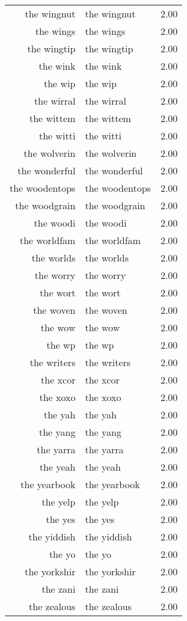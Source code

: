 \begin{table}[ht]
\begin{tabular}{rlr}
  the wingnut & the wingnut & 2.00 \\ 
  the wings & the wings & 2.00 \\ 
  the wingtip & the wingtip & 2.00 \\ 
  the wink & the wink & 2.00 \\ 
  the wip & the wip & 2.00 \\ 
  the wirral & the wirral & 2.00 \\ 
  the wittem & the wittem & 2.00 \\ 
  the witti & the witti & 2.00 \\ 
  the wolverin & the wolverin & 2.00 \\ 
  the wonderful & the wonderful & 2.00 \\ 
  the woodentops & the woodentops & 2.00 \\ 
  the woodgrain & the woodgrain & 2.00 \\ 
  the woodi & the woodi & 2.00 \\ 
  the worldfam & the worldfam & 2.00 \\ 
  the worlds & the worlds & 2.00 \\ 
  the worry & the worry & 2.00 \\ 
  the wort & the wort & 2.00 \\ 
  the woven & the woven & 2.00 \\ 
  the wow & the wow & 2.00 \\ 
  the wp & the wp & 2.00 \\ 
  the writers & the writers & 2.00 \\ 
  the xcor & the xcor & 2.00 \\ 
  the xoxo & the xoxo & 2.00 \\ 
  the yah & the yah & 2.00 \\ 
  the yang & the yang & 2.00 \\ 
  the yarra & the yarra & 2.00 \\ 
  the yeah & the yeah & 2.00 \\ 
  the yearbook & the yearbook & 2.00 \\ 
  the yelp & the yelp & 2.00 \\ 
  the yes & the yes & 2.00 \\ 
  the yiddish & the yiddish & 2.00 \\ 
  the yo & the yo & 2.00 \\ 
  the yorkshir & the yorkshir & 2.00 \\ 
  the zani & the zani & 2.00 \\ 
  the zealous & the zealous & 2.00 \\ 

\end{tabular}
\end{table}
